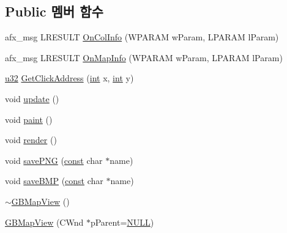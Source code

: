 \subsection*{Public 멤버 함수}
\begin{DoxyCompactItemize}
\item 
afx\+\_\+msg L\+R\+E\+S\+U\+LT \mbox{\hyperlink{class_g_b_map_view_a6a6842be36789566f8fc918ded572bbe}{On\+Col\+Info}} (W\+P\+A\+R\+AM w\+Param, L\+P\+A\+R\+AM l\+Param)
\item 
afx\+\_\+msg L\+R\+E\+S\+U\+LT \mbox{\hyperlink{class_g_b_map_view_afcc3ed555a52330d768b2cfb0f726dfc}{On\+Map\+Info}} (W\+P\+A\+R\+AM w\+Param, L\+P\+A\+R\+AM l\+Param)
\item 
\mbox{\hyperlink{_system_8h_a10e94b422ef0c20dcdec20d31a1f5049}{u32}} \mbox{\hyperlink{class_g_b_map_view_a8071362b1d60245c02266c3d48d51495}{Get\+Click\+Address}} (\mbox{\hyperlink{_util_8cpp_a0ef32aa8672df19503a49fab2d0c8071}{int}} x, \mbox{\hyperlink{_util_8cpp_a0ef32aa8672df19503a49fab2d0c8071}{int}} y)
\item 
void \mbox{\hyperlink{class_g_b_map_view_af907981b2a105364f52d9fc11030a200}{update}} ()
\item 
void \mbox{\hyperlink{class_g_b_map_view_a42de669273417186b01ca6f8d06eb347}{paint}} ()
\item 
void \mbox{\hyperlink{class_g_b_map_view_a48aeac68f689682206749e933513b98e}{render}} ()
\item 
void \mbox{\hyperlink{class_g_b_map_view_a18226efdae32cdcf93b2994d2c002a02}{save\+P\+NG}} (\mbox{\hyperlink{getopt1_8c_a2c212835823e3c54a8ab6d95c652660e}{const}} char $\ast$name)
\item 
void \mbox{\hyperlink{class_g_b_map_view_a90fcc5d761fb5dfdb8f61e405831f3b5}{save\+B\+MP}} (\mbox{\hyperlink{getopt1_8c_a2c212835823e3c54a8ab6d95c652660e}{const}} char $\ast$name)
\item 
\mbox{\hyperlink{class_g_b_map_view_a40c036e1d605f7046fcda2674feea0e1}{$\sim$\+G\+B\+Map\+View}} ()
\item 
\mbox{\hyperlink{class_g_b_map_view_ab0e95e7d8dd6638a2451b7faa6937acb}{G\+B\+Map\+View}} (C\+Wnd $\ast$p\+Parent=\mbox{\hyperlink{_system_8h_a070d2ce7b6bb7e5c05602aa8c308d0c4}{N\+U\+LL}})
\end{DoxyCompactItemize}
